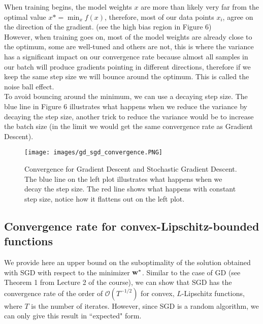 \documentclass{article}
\begin{document}
When training begins, the model weights $x$ are more than likely very far from the optimal value $x*= \min_{x}f(x)$, therefore, most of our data points $x_i$, agree on the direction of the gradient. (see the high bias region in Figure 6)\\

However, when training goes on, most of the model weights are already close to the optimum, some are well-tuned and others are not, this is where the variance has a significant impact on our convergence rate because almost all samples in our batch will produce gradients pointing in different directions, therefore if we keep the same step size we will bounce around the optimum. This is called the noise ball effect.\\

To avoid bouncing around the minimum, we can use a decaying step size. The blue line in Figure 6 illustrates what happens when we reduce the variance by decaying the step size, another trick to reduce the variance would be to increase the batch size (in the limit we would get the same convergence rate as Gradient Descent).

\begin{figure}[H]
  \centering
  \texttt{[image: images/gd\_sgd\_convergence.PNG]}
  \caption{Convergence for Gradient Descent and Stochastic Gradient Descent. The blue line on the left plot illustrates what happens when we decay the step size. The red line shows what happens with constant step size, notice how it flattens out on the left plot.}
\end{figure}


\subsection{Convergence rate for convex-Lipschitz-bounded functions}\label{SGDbound}


We provide here an upper bound on the suboptimality of the solution obtained with SGD with respect to the minimizer ${\bf w}^\ast$. Similar to the case of GD (see Theorem 1 from Lecture 2 of the course), we can show that SGD has the convergence rate of the order of $\mathcal{O}(T^{-1/2})$ for convex, $L$-Lipschitz functions, where $T$ is the number of iterates. However, since SGD is a random algorithm, we can only give this result in ``expected" form. \\
\end{document}

